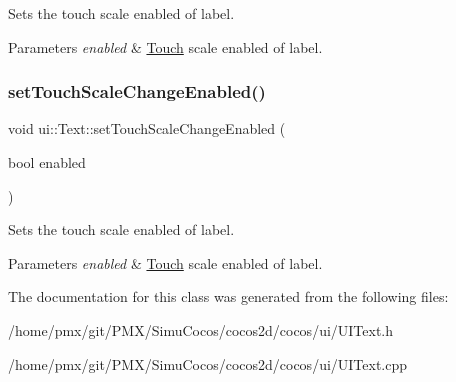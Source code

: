 Sets the touch scale enabled of label.


\begin{DoxyParams}{Parameters}
{\em enabled} & \hyperlink{classTouch}{Touch} scale enabled of label. \\
\hline
\end{DoxyParams}
\mbox{\label{classui_1_1Text_a25d9a398ee8d5e354765a67ae0b1926b}} 
\subsubsection{\texorpdfstring{set\+Touch\+Scale\+Change\+Enabled()}{setTouchScaleChangeEnabled()}\hspace{0.1cm}{\footnotesize\ttfamily [2/2]}}
{\footnotesize\ttfamily void ui\+::\+Text\+::set\+Touch\+Scale\+Change\+Enabled (\begin{DoxyParamCaption}\item[{bool}]{enabled }\end{DoxyParamCaption})}

Sets the touch scale enabled of label.


\begin{DoxyParams}{Parameters}
{\em enabled} & \hyperlink{classTouch}{Touch} scale enabled of label. \\
\hline
\end{DoxyParams}


The documentation for this class was generated from the following files\+:\begin{DoxyCompactItemize}
\item 
/home/pmx/git/\+P\+M\+X/\+Simu\+Cocos/cocos2d/cocos/ui/U\+I\+Text.\+h\item 
/home/pmx/git/\+P\+M\+X/\+Simu\+Cocos/cocos2d/cocos/ui/U\+I\+Text.\+cpp\end{DoxyCompactItemize}

